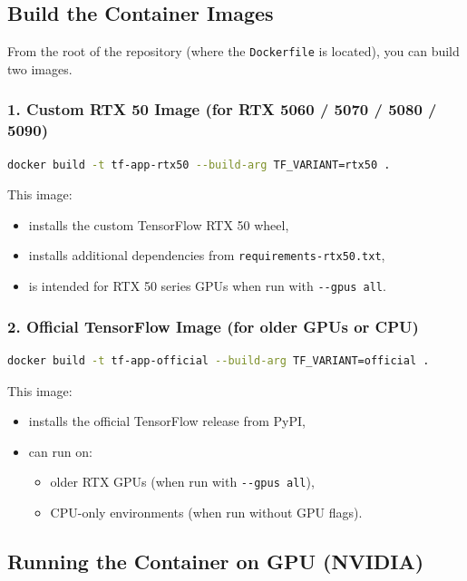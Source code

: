 \documentclass[a4paper,11pt]{article}
\begin{document}
\subsection{Build the Container Images}

From the root of the repository (where the \texttt{Dockerfile} is located), you
can build two images.

\subsubsection{1. Custom RTX 50 Image (for RTX 5060 / 5070 / 5080 / 5090)}


\begin{lstlisting}[language=bash]
docker build -t tf-app-rtx50 --build-arg TF_VARIANT=rtx50 .
\end{lstlisting}


This image:
\begin{itemize}
  \item installs the custom TensorFlow RTX 50 wheel,
  \item installs additional dependencies from \texttt{requirements-rtx50.txt},
  \item is intended for RTX 50 series GPUs when run with \verb|--gpus all|.
\end{itemize}

\subsubsection{2. Official TensorFlow Image (for older GPUs or CPU)}

\begin{lstlisting}[language=bash]
docker build -t tf-app-official --build-arg TF_VARIANT=official .
\end{lstlisting}


This image:
\begin{itemize}
  \item installs the official TensorFlow release from PyPI,
  \item can run on:
    \begin{itemize}
      \item older RTX GPUs (when run with \verb|--gpus all|),
      \item CPU-only environments (when run without GPU flags).
    \end{itemize}
\end{itemize}

\subsection{Running the Container on GPU (NVIDIA)}
\end{document}
